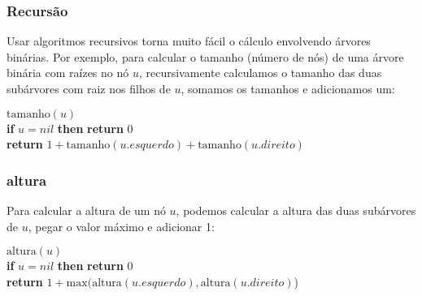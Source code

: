 \documentclass{beamer}
\begin{document}
\begin{frame}
\frametitle{Recursão}
Usar algoritmos recursivos torna muito fácil o cálculo envolvendo árvores binárias. Por exemplo, para calcular o tamanho (número de nós) de uma
árvore binária com raízes no nó \ensuremath{\ensuremath{\ensuremath{\mathit{u}}}}, recursivamente calculamos o tamanho
das duas subárvores com raiz nos filhos de \ensuremath{\ensuremath{\ensuremath{\mathit{u}}}}, somamos os tamanhos e adicionamos um:

\begin{oframed}
\begin{flushleft}
\hspace*{1em} \ensuremath{\mathrm{tamanho}(\ensuremath{\mathit{u}})}\\
\hspace*{1em} \hspace*{1em} {\color{black} \textbf{if}} \ensuremath{\ensuremath{\mathit{u}} = nil} {\color{black} \textbf{then}}  {\color{black} \textbf{return}} \ensuremath{0}\\
\hspace*{1em} \hspace*{1em} {\color{black} \textbf{return}} \ensuremath{1 + \mathrm{tamanho}(\ensuremath{\mathit{u}}.\ensuremath{\mathit{esquerdo}}) + \mathrm{tamanho}(\ensuremath{\mathit{u}}.\ensuremath{\mathit{direito}})}\\
\end{flushleft}
\end{oframed}
\end{frame}

\begin{frame}
\frametitle{altura}
Para calcular a altura de um nó \ensuremath{\ensuremath{\ensuremath{\mathit{u}}}}, podemos calcular a altura das duas subárvores de \ensuremath{\ensuremath{\ensuremath{\mathit{u}}}}, pegar o valor máximo e adicionar 1:

\begin{oframed}
\begin{flushleft}
\hspace*{1em} \ensuremath{\mathrm{altura}(\ensuremath{\mathit{u}})}\\
\hspace*{1em} \hspace*{1em} {\color{black} \textbf{if}} \ensuremath{\ensuremath{\mathit{u}} = nil} {\color{black} \textbf{then}}  {\color{black} \textbf{return}} \ensuremath{0}\\
\hspace*{1em} \hspace*{1em} {\color{black} \textbf{return}} \ensuremath{1 + \mathrm{max}(\mathrm{altura}(\ensuremath{\mathit{u}}.\ensuremath{\mathit{esquerdo}}), \mathrm{altura}(\ensuremath{\mathit{u}}.\ensuremath{\mathit{direito}})})\\
\end{flushleft}
\end{oframed}
\end{frame}
\end{document}

